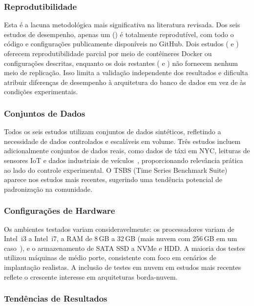 \subsubsection{Reprodutibilidade}

Esta é a lacuna metodológica mais significativa na literatura revisada. Dos seis estudos de
desempenho, apenas um (\citep{pereira2023mulletbench}) é totalmente reprodutível, com todo o
código e configurações publicamente disponíveis no GitHub. Dois estudos
(\citep{lima2024avaliando} e \citep{wang2023iotdb}) oferecem reprodutibilidade parcial por meio
de contêineres Docker ou configurações descritas, enquanto os dois restantes
(\citep{shah2022performance} e \citep{naqvi2017influxdb}) não fornecem nenhum meio de replicação.
Isso limita a validação independente dos resultados e dificulta atribuir diferenças de
desempenho à arquitetura do banco de dados em vez de às condições experimentais.

\subsubsection{Conjuntos de Dados}

Todos os seis estudos utilizam conjuntos de dados sintéticos, refletindo a necessidade de
dados controlados e escaláveis em volume. Três estudos incluem adicionalmente conjuntos de
dados reais, como dados de táxi em NYC, leituras de sensores IoT e dados industriais de
veículos~\citep{shah2022performance,naqvi2017influxdb,wang2023iotdb}, proporcionando relevância
prática ao lado do controle experimental. O TSBS (Time Series Benchmark Suite) aparece nos
estudos mais recentes, sugerindo uma tendência potencial de padronização na comunidade.

\subsubsection{Configurações de Hardware}

Os ambientes testados variam consideravelmente: os processadores variam de Intel~i3 a
Intel~i7, a RAM de 8\,GB a 32\,GB (mais nuvem com 256\,GB em um caso~\citep{wang2023iotdb}),
e o armazenamento de SATA SSD a NVMe e HDD. A maioria dos testes utilizou máquinas de médio
porte, consistente com foco em cenários de implantação realistas. A inclusão de testes em nuvem
em estudos mais recentes~\citep{pereira2023mulletbench,wang2023iotdb} reflete o crescente
interesse em arquiteturas borda-nuvem.

\subsubsection{Tendências de Resultados}

